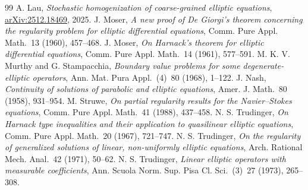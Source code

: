 \documentclass[11pt,letterpaper]{article}
\numberwithin{equation}{section}
\theoremstyle{definition}
\begin{document}
\begin{thebibliography}{99}
A. Lau, \emph{Stochastic homogenization of coarse-grained elliptic equations}, \href{https://arxiv.org/abs/2512.18469}{arXiv:2512.18469}, 2025.
J. Moser, \emph{A new proof of De Giorgi's theorem concerning the regularity problem for elliptic differential equations}, Comm. Pure Appl. Math.~13 (1960), 457--468.
J. Moser, \emph{On Harnack's theorem for elliptic differential equations}, Comm. Pure Appl. Math.~14 (1961), 577--591.
M. K. V. Murthy and G. Stampacchia, \emph{Boundary value problems for some degenerate-elliptic operators}, Ann. Mat. Pura Appl.~(4)~80 (1968), 1--122.
J. Nash, \emph{Continuity of solutions of parabolic and elliptic equations}, Amer. J. Math.~80 (1958), 931--954.
M. Struwe, \emph{On partial regularity results for the Navier--Stokes equations}, Comm. Pure Appl. Math.~41 (1988), 437--458.
N. S. Trudinger, \emph{On Harnack type inequalities and their application to quasilinear elliptic equations}, Comm. Pure Appl. Math.~20 (1967), 721--747.
N. S. Trudinger, \emph{On the regularity of generalized solutions of linear, non-uniformly elliptic equations}, Arch. Rational Mech. Anal.~42 (1971), 50--62.
N. S. Trudinger, \emph{Linear elliptic operators with measurable coefficients}, Ann. Scuola Norm. Sup. Pisa Cl. Sci.~(3)~27 (1973), 265--308.
\end{thebibliography}
\end{document}

